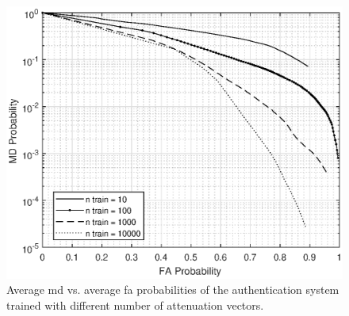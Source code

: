 \documentclass[twocolumns]{IEEEtran}
\begin{document}
\begin{figure}[h]
    \centering
    \includegraphics[width=1\columnwidth]{mean_maps.eps}
    \caption{Average \ac{md} vs. average \ac{fa} probabilities of the authentication system trained with different number of attenuation vectors.}
    \label{fig:avgMap}
\end{figure}

\renewcommand*{\bibfont}{\footnotesize}

\printbibliography
\end{document}
